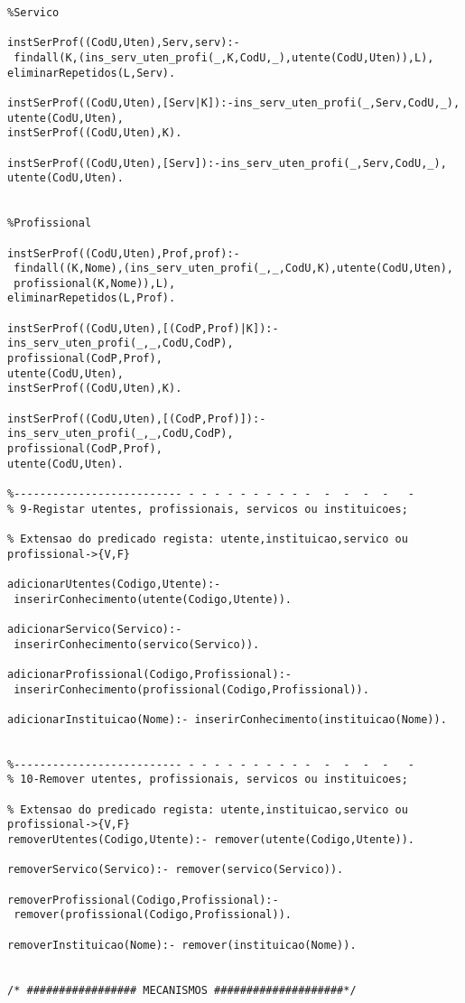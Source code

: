 \documentclass[pdftex,12pt,a4paper]{report}
\begin{document}
\begin{appendices}
\begin{Verbatim}
%Servico

instSerProf((CodU,Uten),Serv,serv):-
 findall(K,(ins_serv_uten_profi(_,K,CodU,_),utente(CodU,Uten)),L),
eliminarRepetidos(L,Serv).

instSerProf((CodU,Uten),[Serv|K]):-ins_serv_uten_profi(_,Serv,CodU,_),
utente(CodU,Uten),
instSerProf((CodU,Uten),K).

instSerProf((CodU,Uten),[Serv]):-ins_serv_uten_profi(_,Serv,CodU,_),
utente(CodU,Uten).


%Profissional

instSerProf((CodU,Uten),Prof,prof):-
 findall((K,Nome),(ins_serv_uten_profi(_,_,CodU,K),utente(CodU,Uten),
 profissional(K,Nome)),L),
eliminarRepetidos(L,Prof).

instSerProf((CodU,Uten),[(CodP,Prof)|K]):-
ins_serv_uten_profi(_,_,CodU,CodP),
profissional(CodP,Prof),
utente(CodU,Uten),
instSerProf((CodU,Uten),K).

instSerProf((CodU,Uten),[(CodP,Prof)]):-
ins_serv_uten_profi(_,_,CodU,CodP),
profissional(CodP,Prof),
utente(CodU,Uten).

%-------------------------- - - - - - - - - - -  -  -  -  -   -         
% 9-Registar utentes, profissionais, servicos ou instituicoes;

% Extensao do predicado regista: utente,instituicao,servico ou profissional->{V,F}

adicionarUtentes(Codigo,Utente):-
 inserirConhecimento(utente(Codigo,Utente)).

adicionarServico(Servico):-
 inserirConhecimento(servico(Servico)).

adicionarProfissional(Codigo,Profissional):-
 inserirConhecimento(profissional(Codigo,Profissional)).

adicionarInstituicao(Nome):- inserirConhecimento(instituicao(Nome)).


%-------------------------- - - - - - - - - - -  -  -  -  -   -         
% 10-Remover utentes, profissionais, servicos ou instituicoes;

% Extensao do predicado regista: utente,instituicao,servico ou profissional->{V,F}
removerUtentes(Codigo,Utente):- remover(utente(Codigo,Utente)).

removerServico(Servico):- remover(servico(Servico)).

removerProfissional(Codigo,Profissional):-
 remover(profissional(Codigo,Profissional)).

removerInstituicao(Nome):- remover(instituicao(Nome)).


/* ################# MECANISMOS ####################*/


\end{Verbatim}
\end{appendices}
\end{document}
